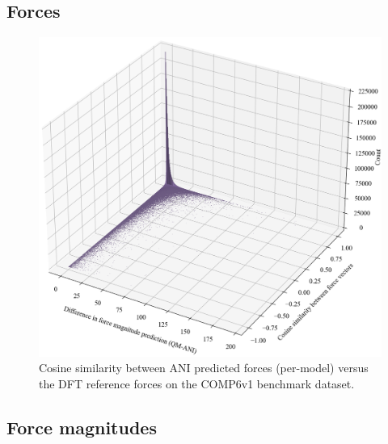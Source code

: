 \subsection{Forces}
\label{subsec:forces}

\begin{figure}[H]
    \centering
    \includegraphics[width=1\linewidth]{Images/2xr_forces/2xr_comp6v1_force-cosine_sim-bar3d.png}
    \caption[Per-model cosine similarity measure of predicted atomic force vectors]{
    Cosine similarity between ANI predicted forces (per-model) versus the DFT reference forces on the COMP6v1 benchmark dataset.
    }
    \label{fig:2xr_comp6v1-forces-cos_sim}
\end{figure}

\subsection{Force magnitudes}
\label{subsec:force_magnitudes}

